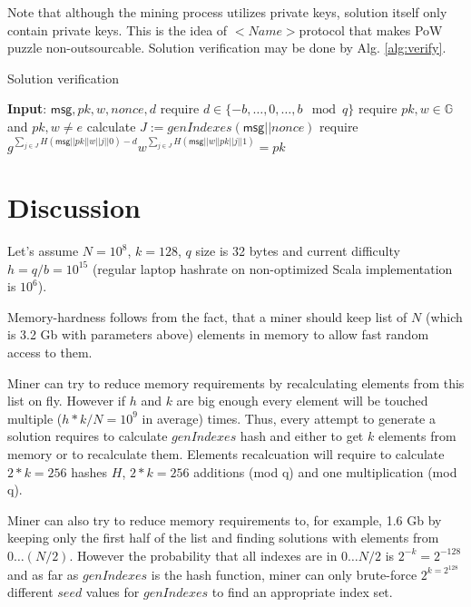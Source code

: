 \documentclass[]{article}
\newcommand{\Name}{$<Name>$}
\newcommand{\msg}{\mathsf{msg}}
\begin{document}
    Note that although the mining process utilizes private keys, solution itself
    only contain private keys. This is the idea of \Name protocol that makes
    PoW puzzle non-outsourcable. Solution verification may be done by Alg. \ref{alg:verify}.

    \begin{algorithm}[H]
        \caption{Solution verification}
        \label{alg:verify}
        \begin{algorithmic}[1]
            \State \textbf{Input}: $\msg,pk,w,nonce,d$
            \State require $d\in\{-b,\dots,0,\dots, b\mod q\}$
            \State require $pk,w\in \mathbb{G}$ and $pk,w \ne e$
            \State calculate $J:=genIndexes(\msg||nonce)$
            \State require $g^{\sum_{j \in J} H(\msg||pk||w||j||0) - d}
            w^{\sum_{j \in J} H(\msg||w||pk||j||1)} = pk$
        \end{algorithmic}
    \end{algorithm}

    \section{Discussion}

    Let's assume $N=10^8$, $k=128$, $q$ size is 32 bytes and current difficulty
    $h = q / b = 10^{15}$ (regular laptop hashrate on non-optimized Scala implementation is $10^6$).

    Memory-hardness follows from the fact, that a miner should keep list of $N$
    (which is 3.2 Gb with parameters above) elements in memory to allow fast random access to them.

    Miner can try to reduce memory requirements by recalculating elements from this list on fly.
    However if $h$ and $k$ are big enough
    every element will be touched multiple ($h * k / N = 10^9$ in average) times.
    Thus, every attempt to generate a solution requires to calculate $genIndexes$ hash and
    either to get $k$ elements from memory or to recalculate them.
    Elements recalcuation will require to calculate $2 * k = 256$ hashes $H$,
    $2 * k = 256$ additions (mod q) and one multiplication (mod q).

    Miner can also try to reduce memory requirements to, for example, 1.6 Gb
    by keeping only the first half of the list and finding solutions
    with elements from $0 \dots (N/2)$.
    However the probability that all indexes are in $0 \dots N/2$ is
    $2^{-k}=2^{-128}$ and as far as $genIndexes$
    is the hash function, miner can only brute-force $2^{k=2^{128}}$ different $seed$ values for $genIndexes$
    to find an appropriate index set.
\end{document}
